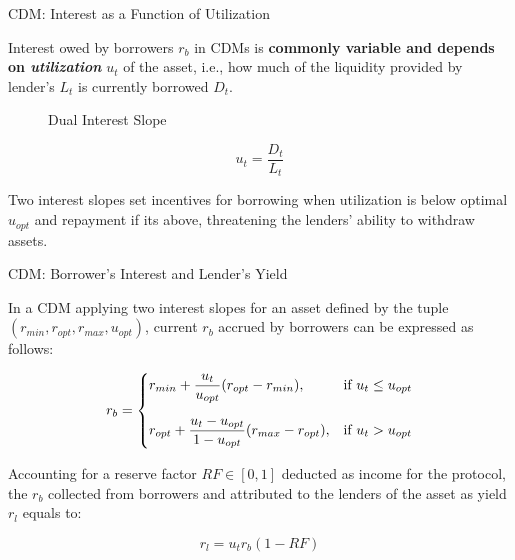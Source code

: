 \documentclass[handout]{beamer}
\begin{document}
\begin{frame}{CDM: Interest as a Function of Utilization }

Interest owed by borrowers $r_b$ in CDMs is \textbf{commonly variable and depends on \textit{utilization}} $u_t$ of the asset, i.e., how much of the liquidity provided by lender's $L_t$ is currently borrowed $D_t$.

\vspace{1.5em}

 {
\begin{minipage}{0.6\textwidth}
	\begin{figure}[t]
		\centering
		\begin{tikzpicture}[scale=0.5, every node/.style={scale=0.8}]
			
		\end{tikzpicture}
		\caption{Dual Interest Slope}
	\end{figure}
\end{minipage}
\begin{minipage}{0.38\textwidth}
	\vspace{-1em}
	\begin{equation*}
		u_t = \dfrac{D_t}{L_t}
	\end{equation*}
	
	\vspace{0.5 em}
	Two interest slopes set incentives for borrowing when utilization is below optimal $u_{opt}$ and repayment if its above, threatening the lenders' ability to withdraw assets.
	
\end{minipage}	
}

\end{frame}


\begin{frame}{CDM: Borrower's Interest and Lender's Yield }

In a CDM applying two interest slopes for an asset defined by the tuple $(r_{min}, r_{opt}, r_{max}, u_{opt})$, current $r_b$ accrued by borrowers can be expressed as follows:


\begin{equation*}
	r_b = 
		\begin{cases}
		r_{min} + \dfrac{u_t}{u_{opt}}(r_{opt}-r_{min}), & \text{if } u_t \leq u_{opt} \vspace{1em}\\
		r_{opt} + \dfrac{u_t-u_{opt}}{1-u_{opt}}(r_{max}-r_{opt}), & \text{if } u_t > u_{opt}
		\end{cases}
\end{equation*}

\vspace{1em}

 {
Accounting for a reserve factor $RF \in [0,1]$ deducted as income for the protocol, the $r_b$ collected from borrowers and attributed to the lenders of the asset as yield $r_l$ equals to:

\begin{equation*}
	r_l = u_t r_b (1-RF) 
\end{equation*}
}

\end{frame}
\end{document}
